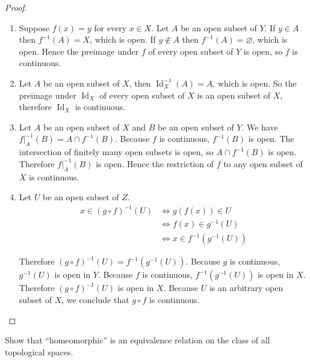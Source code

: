 \begin{proof}
	\begin{enumerate}[label={(\alph*)}]
		\item Suppose $f(x) = y$ for every $x\in X$. Let $A$ be an open subset of $Y$. If $y\in A$ then $f^{-1}(A) = X$, which is open. If $y\notin A$ then $f^{-1}(A) = \varnothing$, which is open. Hence the preimage under $f$ of every open subset of $Y$ is open, so $f$ is continuous.
		\item Let $A$ be an open subset of $X$, then $\operatorname{Id}_{X}^{-1}(A) = A$, which is open. So the preimage under $\operatorname{Id}_{X}$ of every open subset of $X$ is an open subset of $X$, therefore $\operatorname{Id}_{X}$ is continuous.
		\item Let $A$ be an open subset of $X$ and $B$ be an open subset of $Y$. We have $f\vert_{A}^{-1}(B) = A\cap f^{-1}(B)$. Because $f$ is continuous, $f^{-1}(B)$ is open. The intersection of finitely many open subsets is open, so $A\cap f^{-1}(B)$ is open. Therefore $f\vert_{A}^{-1}(B)$ is open. Hence the restriction of $f$ to any open subset of $X$ is continuous.
		\item Let $U$ be an open subset of $Z$.
		      \begin{align*}
			      x\in {(g\circ f)}^{-1}(U) & \Longleftrightarrow g(f(x))\in U           \\
			                                & \Longleftrightarrow f(x)\in g^{-1}(U)      \\
			                                & \Longleftrightarrow x\in f^{-1}(g^{-1}(U))
		      \end{align*}

		      Therefore ${(g\circ f)}^{-1}(U) = f^{-1}(g^{-1}(U))$. Because $g$ is continuous, $g^{-1}(U)$ is open in $Y$. Because $f$ is continuous, $f^{-1}(g^{-1}(U))$ is open in $X$. Therefore ${(g\circ f)}^{-1}(U)$ is open in $X$. Because $U$ is an arbitrary open subset of $X$, we conclude that $g\circ f$ is continuous.
	\end{enumerate}
\end{proof}

\begin{exercise}{2.20}
	Show that ``homeomorphic'' is an equivalence relation on the class of all topological spaces.
\end{exercise}

